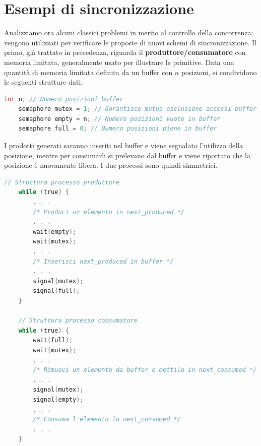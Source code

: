 %

\section{Esempi di sincronizzazione}
Analizziamo ora alcuni classici problemi in merito al controllo della concorrenza; vengono utilizzati per verificare le proposte di nuovi schemi di
sincronizzazione. Il primo, già trattato in precedenza, riguarda il \textbf{produttore/consumatore} con memoria limitata, generalmente usato per
illustrare le primitive. Data una quantità di memoria limitata definita da un buffer con $n$ posizioni, si condividono le seguenti strutture dati:
\begin{lstlisting}[language=C]
    int n; // Numero posizioni buffer
    semaphore mutex = 1; // Garantisce mutua esclusione accessi buffer
    semaphore empty = n; // Numero posizioni vuote in buffer
    semaphore full = 0; // Numero posizioni piene in buffer
\end{lstlisting}

\noindent I prodotti generati saranno inseriti nel buffer e viene segnalato l'utilizzo della posizione, mentre per consumarli si prelevano dal buffer e
viene riportato che la posizione è nuovamente libera. I due processi sono quindi simmetrici.
\begin{lstlisting}[language=C]
    // Struttura processo produttore
    while (true) {
        . . .
        /* Produci un elemento in next_produced */
        . . .
        wait(empty);
        wait(mutex);
        . . .
        /* Inserisci next_produced in buffer */
        . . .
        signal(mutex);
        signal(full);
    }

    // Struttura processo consumatore
    while (true) {
        wait(full);
        wait(mutex);
        . . .
        /* Rimuovi un elemento da buffer e mettilo in next_consumed */
        . . .
        signal(mutex);
        signal(empty);
        . . .
        /* Consuma l'elemento in next_consumed */
        . . .
    }
\end{lstlisting}

